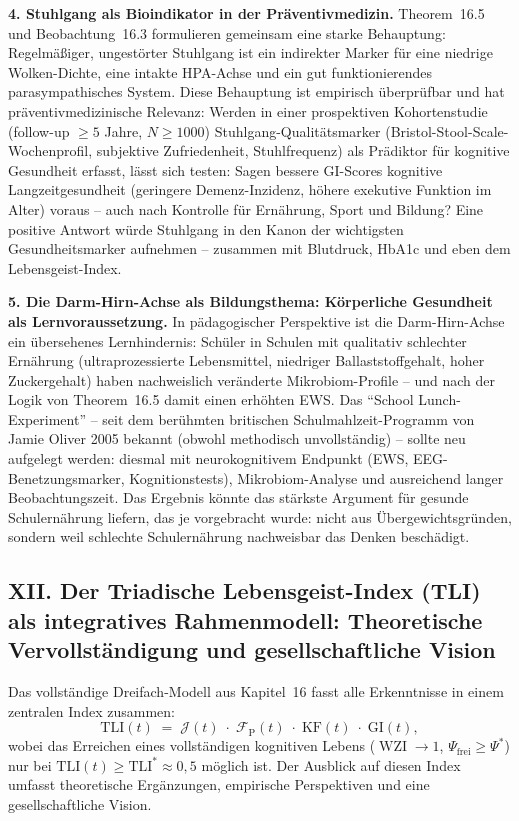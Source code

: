 ﻿\documentclass[12pt,a4paper]{report}
\theoremstyle{plain}
\theoremstyle{definition}
\theoremstyle{remark}
\DeclareMathOperator{\WZI}{WZI}
\begin{document}
	\textbf{4. Stuhlgang als Bioindikator in der Präventivmedizin.}
	Theorem~16.5 und Beobachtung~16.3 formulieren gemeinsam eine
	starke Behauptung: Regelmäßiger, ungestörter Stuhlgang ist
	ein indirekter Marker für eine niedrige Wolken-Dichte,
	eine intakte HPA-Achse und ein gut funktionierendes
	parasympathisches System.
	Diese Behauptung ist empirisch überprüfbar und hat
	präventivmedizinische Relevanz: Werden in einer prospektiven
	Kohortenstudie (follow-up $\geq 5$ Jahre, $N \geq 1000$)
	Stuhlgang-Qualitätsmarker (Bristol-Stool-Scale-Wochenprofil,
	subjektive Zufriedenheit, Stuhlfrequenz) als Prädiktor für
	kognitive Gesundheit erfasst, lässt sich testen:
	Sagen bessere GI-Scores kognitive Langzeitgesundheit
	(geringere Demenz-Inzidenz, höhere exekutive Funktion im Alter)
	voraus -- auch nach Kontrolle für Ernährung, Sport und Bildung?
	Eine positive Antwort würde Stuhlgang in den Kanon der
	wichtigsten Gesundheitsmarker aufnehmen -- zusammen mit Blutdruck,
	HbA1c und eben dem Lebensgeist-Index.

	\textbf{5. Die Darm-Hirn-Achse als Bildungsthema: Körperliche
		Gesundheit als Lernvoraussetzung.}
	In pädagogischer Perspektive ist die Darm-Hirn-Achse ein
	übersehenes Lernhindernis:
	Schüler in Schulen mit qualitativ schlechter Ernährung
	(ultraprozessierte Lebensmittel, niedriger Ballaststoffgehalt,
	hoher Zuckergehalt) haben nachweislich veränderte Mikrobiom-Profile --
	und nach der Logik von Theorem~16.5 damit einen erhöhten EWS.
	Das ``School Lunch-Experiment'' -- seit dem berühmten
	britischen Schulmahlzeit-Programm von Jamie Oliver 2005
	bekannt (obwohl methodisch unvollständig) --
	sollte neu aufgelegt werden: diesmal mit neurokognitivem
	Endpunkt (EWS, EEG-Benetzungsmarker, Kognitionstests),
	Mikrobiom-Analyse und ausreichend langer Beobachtungszeit.
	Das Ergebnis könnte das stärkste Argument für
	gesunde Schulernährung liefern, das je vorgebracht wurde:
	nicht aus Übergewichtsgründen, sondern weil schlechte
	Schulernährung nachweisbar das Denken beschädigt.

	\subsection*{XII. Der Triadische Lebensgeist-Index (TLI)
		als integratives Rahmenmodell: Theoretische Vervollständigung
		und gesellschaftliche Vision}

	Das vollständige Dreifach-Modell aus Kapitel~16 fasst alle
	Erkenntnisse in einem zentralen Index zusammen:
	\[
	\mathrm{TLI}(t)
	\;=\;
	\mathcal{J}(t)\;\cdot\;\mathcal{F}_{\mathrm{P}}(t)
	\;\cdot\;\mathrm{KF}(t)\;\cdot\;\mathrm{GI}(t),
	\]
	wobei das Erreichen eines vollständigen kognitiven Lebens
	($\WZI \to 1$, $\Psi_{\mathrm{frei}} \geq \Psi^*$)
	nur bei $\mathrm{TLI}(t) \geq \mathrm{TLI}^* \approx 0{,}5$ möglich ist.
	Der Ausblick auf diesen Index umfasst theoretische Ergänzungen,
	empirische Perspektiven und eine gesellschaftliche Vision.
\end{document}
